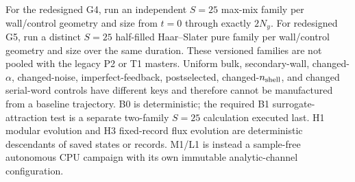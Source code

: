 \documentclass[aps,prx,twocolumn,floatfix,nofootinbib,superscriptaddress,longbibliography]{revtex4-2}
\begin{document}
For the redesigned G4, run an independent $S=25$ max-mix family per wall/control geometry
and size from $t=0$ through exactly $2N_y$.  For redesigned G5, run a distinct $S=25$
half-filled Haar--Slater pure family per wall/control geometry and size over the same
duration.  These versioned families are not pooled with the legacy P2 or T1 masters.
Uniform bulk, secondary-wall, changed-$\alpha$, changed-noise, imperfect-feedback,
postselected, changed-$n_{\rm shell}$, and changed serial-word controls have different keys
and therefore cannot be manufactured from a baseline trajectory.  B0 is deterministic;
the required B1 surrogate-attraction test is a separate two-family $S=25$ calculation
executed last.  H1 modular evolution and H3 fixed-record flux evolution are deterministic
descendants of saved states or records.  M1/L1 is instead a sample-free autonomous CPU
campaign with its own immutable analytic-channel configuration.
\end{document}
